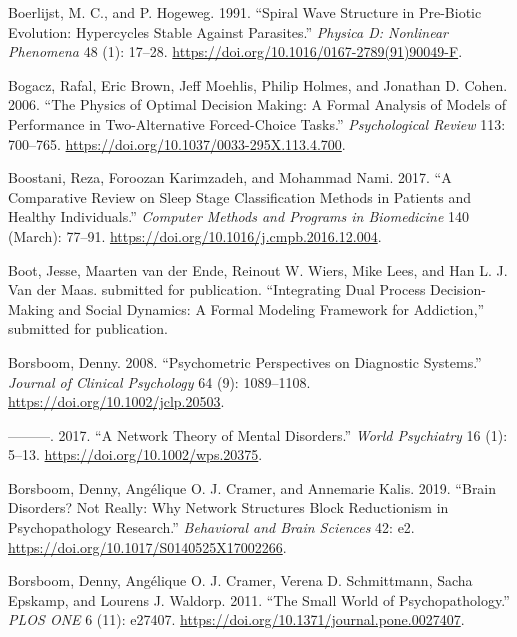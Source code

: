 \documentclass[
  a4paper,
  DIV=11,
  numbers=noendperiod,
  oneside]{scrreprt}
\newlength{\cslhangindent}
\newenvironment{CSLReferences}[2] %
 {\begin{list}{}{%
  \setlength{\itemindent}{0pt}
  \setlength{\leftmargin}{0pt}
  \setlength{\parsep}{0pt}
  \ifodd #1
   \setlength{\leftmargin}{\cslhangindent}
   \setlength{\itemindent}{-1\cslhangindent}
  \fi
  \setlength{\itemsep}{#2\baselineskip}}}
 {\end{list}}
\begin{document}
\begin{CSLReferences}{1}{0}
Boerlijst, M. C., and P. Hogeweg. 1991. {``Spiral Wave Structure in
Pre-Biotic Evolution: {Hypercycles} Stable Against Parasites.''}
\emph{Physica D: Nonlinear Phenomena} 48 (1): 17--28.
\url{https://doi.org/10.1016/0167-2789(91)90049-F}.

Bogacz, Rafal, Eric Brown, Jeff Moehlis, Philip Holmes, and Jonathan D.
Cohen. 2006. {``The Physics of Optimal Decision Making: {A} Formal
Analysis of Models of Performance in Two-Alternative Forced-Choice
Tasks.''} \emph{Psychological Review} 113: 700--765.
\url{https://doi.org/10.1037/0033-295X.113.4.700}.

Boostani, Reza, Foroozan Karimzadeh, and Mohammad Nami. 2017. {``A
Comparative Review on Sleep Stage Classification Methods in Patients and
Healthy Individuals.''} \emph{Computer Methods and Programs in
Biomedicine} 140 (March): 77--91.
\url{https://doi.org/10.1016/j.cmpb.2016.12.004}.

Boot, Jesse, Maarten van der Ende, Reinout W. Wiers, Mike Lees, and Han
L. J. Van der Maas. submitted for publication. {``Integrating {Dual
Process Decision-Making} and {Social Dynamics}: {A Formal Modeling
Framework} for {Addiction},''} submitted for publication.

Borsboom, Denny. 2008. {``Psychometric Perspectives on Diagnostic
Systems.''} \emph{Journal of Clinical Psychology} 64 (9): 1089--1108.
\url{https://doi.org/10.1002/jclp.20503}.

---------. 2017. {``A Network Theory of Mental Disorders.''} \emph{World
Psychiatry} 16 (1): 5--13. \url{https://doi.org/10.1002/wps.20375}.

Borsboom, Denny, Angélique O. J. Cramer, and Annemarie Kalis. 2019.
{``Brain Disorders? Not Really: Why Network Structures Block
Reductionism in Psychopathology Research.''} \emph{Behavioral and Brain
Sciences} 42: e2. \url{https://doi.org/10.1017/S0140525X17002266}.

Borsboom, Denny, Angélique O. J. Cramer, Verena D. Schmittmann, Sacha
Epskamp, and Lourens J. Waldorp. 2011. {``The {Small World} of
{Psychopathology}.''} \emph{PLOS ONE} 6 (11): e27407.
\url{https://doi.org/10.1371/journal.pone.0027407}.


\end{CSLReferences}
\end{document}
